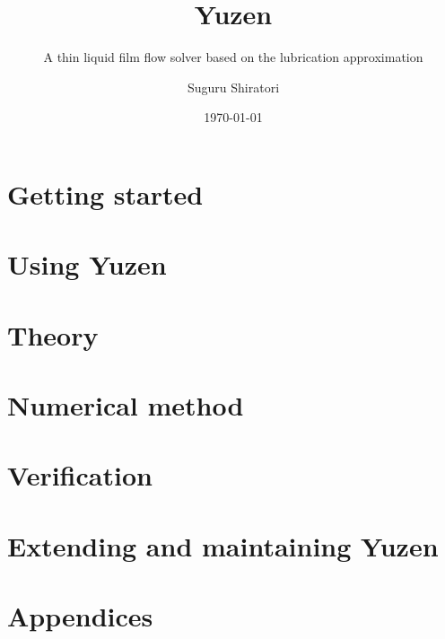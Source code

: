 \documentclass[11pt, a4paper, twoside, openright, numbers=noenddot,
               parskip=half-, DIV=12, BCOR=6mm]{scrbook}
\title{Yuzen}
\subtitle{A thin liquid film flow solver based on the lubrication approximation}
\author{Suguru Shiratori}
\date{\today}
\begin{document}
\frontmatter


\cleardoublepage
{}
\tableofcontents



\mainmatter

\part{Getting started}




\part{Using Yuzen}








\part{Theory}





\part{Numerical method}






\part{Verification}



\part{Extending and maintaining Yuzen}



\appendix
\part{Appendices}






\backmatter

\end{document}
